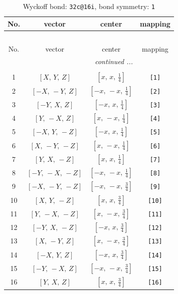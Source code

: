 \documentclass[fleqn,8pt]{jsarticle}
\begin{document}
\begin{longtable}{cccc}
\caption{Wyckoff bond: {\tt 32c@16i}, bond symmetry: {\tt 1}}
 \\
 \hline \hline
No. & vector & center & mapping \\ \hline \endfirsthead

\multicolumn{3}{l}{\tablename\ \thetable{}} \\
 \hline \hline
No. & vector & center & mapping \\ \hline \endhead

 \hline \hline
\multicolumn{3}{r}{\footnotesize\it continued ...} \\ \endfoot

 \hline \hline
\multicolumn{3}{r}{} \\ \endlastfoot

1 & $\left[ X,\, Y,\, Z \right]$ & $\left[ x,\, x,\, \frac{1}{4} \right]$ & {\tt [1]} \\ \hline
2 & $\left[ - X,\, - Y,\, Z \right]$ & $\left[ - x,\, - x,\, \frac{1}{4} \right]$ & {\tt [2]} \\ \hline
3 & $\left[ - Y,\, X,\, Z \right]$ & $\left[ - x,\, x,\, \frac{1}{4} \right]$ & {\tt [3]} \\ \hline
4 & $\left[ Y,\, - X,\, Z \right]$ & $\left[ x,\, - x,\, \frac{1}{4} \right]$ & {\tt [4]} \\ \hline
5 & $\left[ - X,\, Y,\, - Z \right]$ & $\left[ - x,\, x,\, \frac{1}{4} \right]$ & {\tt [5]} \\ \hline
6 & $\left[ X,\, - Y,\, - Z \right]$ & $\left[ x,\, - x,\, \frac{1}{4} \right]$ & {\tt [6]} \\ \hline
7 & $\left[ Y,\, X,\, - Z \right]$ & $\left[ x,\, x,\, \frac{1}{4} \right]$ & {\tt [7]} \\ \hline
8 & $\left[ - Y,\, - X,\, - Z \right]$ & $\left[ - x,\, - x,\, \frac{1}{4} \right]$ & {\tt [8]} \\ \hline
9 & $\left[ - X,\, - Y,\, - Z \right]$ & $\left[ - x,\, - x,\, \frac{3}{4} \right]$ & {\tt [9]} \\ \hline
10 & $\left[ X,\, Y,\, - Z \right]$ & $\left[ x,\, x,\, \frac{3}{4} \right]$ & {\tt [10]} \\ \hline
11 & $\left[ Y,\, - X,\, - Z \right]$ & $\left[ x,\, - x,\, \frac{3}{4} \right]$ & {\tt [11]} \\ \hline
12 & $\left[ - Y,\, X,\, - Z \right]$ & $\left[ - x,\, x,\, \frac{3}{4} \right]$ & {\tt [12]} \\ \hline
13 & $\left[ X,\, - Y,\, Z \right]$ & $\left[ x,\, - x,\, \frac{3}{4} \right]$ & {\tt [13]} \\ \hline
14 & $\left[ - X,\, Y,\, Z \right]$ & $\left[ - x,\, x,\, \frac{3}{4} \right]$ & {\tt [14]} \\ \hline
15 & $\left[ - Y,\, - X,\, Z \right]$ & $\left[ - x,\, - x,\, \frac{3}{4} \right]$ & {\tt [15]} \\ \hline
16 & $\left[ Y,\, X,\, Z \right]$ & $\left[ x,\, x,\, \frac{3}{4} \right]$ & {\tt [16]} \\
\end{longtable}
\end{document}
